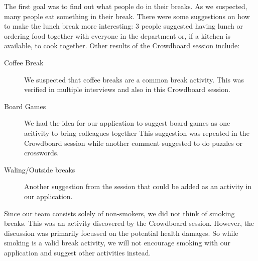 The first goal was to find out what people do in their breaks. As we suspected, many people eat something in their break. There were some suggestions on how to make the lunch break more interesting: 3 people suggested having lunch or ordering food together with everyone in the department or, if a kitchen is available, to cook together. Other results of the Crowdboard session include: 
\begin{description}
  \item[Coffee Break] We suspected that coffee breaks are a common break activity. This was verified in multiple interviews and also in this Crowdboard session.
  \item[Board Games] We had the idea for our application to suggest board games as one acitivity to bring colleagues together This suggestion was repeated in the Crowdboard session while another comment suggested to do puzzles or crosswords.
  \item[Waling/Outside breaks] Another suggestion from the session that could be added as an activity in our application.
\end{description}

Since our team consists solely of non-smokers, we did not think of smoking breaks. This was an activity discovered by the Crowdboard session. However, the discussion was primarily focussed on the potential health damages. So while smoking is a valid break activity, we will not encourage smoking with our application and suggest other activities instead.


